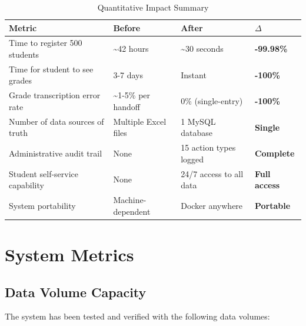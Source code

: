 \begin{table}[H]
    \centering
    \renewcommand{\arraystretch}{1.3}
    \scriptsize
    \begin{tabular}{|p{3.2cm}|p{2.2cm}|p{4.0cm}|p{1.6cm}|}
        \hline
        \textbf{Metric} & \textbf{Before} & \textbf{After} & \textbf{$\Delta$} \\
        \hline
        Time to register 500 students & \textasciitilde42 hours & \textasciitilde30 seconds & \textbf{-99.98\%} \\
        \hline
        Time for student to see grades & 3-7 days & Instant & \textbf{-100\%} \\
        \hline
        Grade transcription error rate & \textasciitilde1-5\% per handoff & 0\% (single-entry) & \textbf{-100\%} \\
        \hline
        Number of data sources of truth & Multiple Excel files & 1 MySQL database & \textbf{Single} \\
        \hline
        Administrative audit trail & None & 15 action types logged & \textbf{Complete} \\
        \hline
        Student self-service capability & None & 24/7 access to all data & \textbf{Full access} \\
        \hline
        System portability & Machine-dependent & Docker anywhere & \textbf{Portable} \\
        \hline
    \end{tabular}
    \caption{Quantitative Impact Summary}
    \label{tab:quantitative-impact}
\end{table}

\newpage
\section{System Metrics}
\label{sec:system-metrics}

\subsection{Data Volume Capacity}

The system has been tested and verified with the following data volumes:

